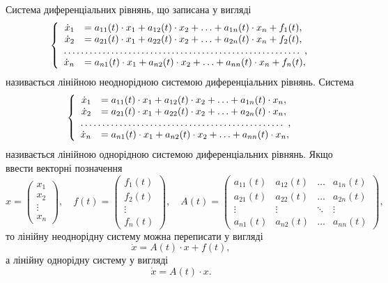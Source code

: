 Система диференціальних рівнянь, що записана у вигляді
\begin{equation*}
	\left\{
		\begin{array}{rl}
			\dot x_1 &= a_{11}(t) \cdot x_1 + a_{12}(t) \cdot x_2 + \ldots + a_{1n}(t) \cdot x_n + f_1(t), \\
			\dot x_2 &= a_{21}(t) \cdot x_1 + a_{22}(t) \cdot x_2 + \ldots + a_{2n}(t) \cdot x_n + f_2(t), \\
			\hdotsfor{2}, \\
			\dot x_n &= a_{n1}(t) \cdot x_1 + a_{n2}(t) \cdot x_2 + \ldots + a_{nn}(t) \cdot x_n + f_n(t),
		\end{array}
	\right.
\end{equation*}
називається лінійною неоднорідною системою диференціальних рівнянь. Система 
\begin{equation*}
	\left\{
		\begin{array}{rl}
			\dot x_1 &= a_{11}(t) \cdot x_1 + a_{12}(t) \cdot x_2 + \ldots + a_{1n}(t) \cdot x_n, \\
			\dot x_2 &= a_{21}(t) \cdot x_1 + a_{22}(t) \cdot x_2 + \ldots + a_{2n}(t) \cdot x_n, \\
			\hdotsfor{2}, \\
			\dot x_n &= a_{n1}(t) \cdot x_1 + a_{n2}(t) \cdot x_2 + \ldots + a_{nn}(t) \cdot x_n,
		\end{array}
	\right.
\end{equation*}
називається лінійною однорідною системою диференціальних рівнянь. Якщо ввести векторні позначення
\begin{equation*}
	x = \begin{pmatrix} x_1 \\ x_2 \\ \vdots \\ x_n \end{pmatrix}, \quad 
	f(t) = \begin{pmatrix} f_1(t) \\ f_2(t) \\ \vdots \\ f_n(t) \end{pmatrix}, \quad
	A(t) = \begin{pmatrix} a_{11}(t) & a_{12}(t) & \ldots & a_{1n}(t) \\ a_{21}(t) & a_{22}(t) & \ldots & a_{2n}(t) \\ \vdots & \vdots & \ddots & \vdots \\ a_{n1}(t) & a_{n2}(t) & \ldots & a_{nn}(t) \end{pmatrix},
\end{equation*}
то лінійну неоднорідну систему можна переписати у вигляді
\begin{equation*}
	\dot x = A(t) \cdot x + f(t),
\end{equation*}
а лінійну однорідну систему у вигляді
\begin{equation*}
	\dot x = A(t) \cdot x.
\end{equation*}

